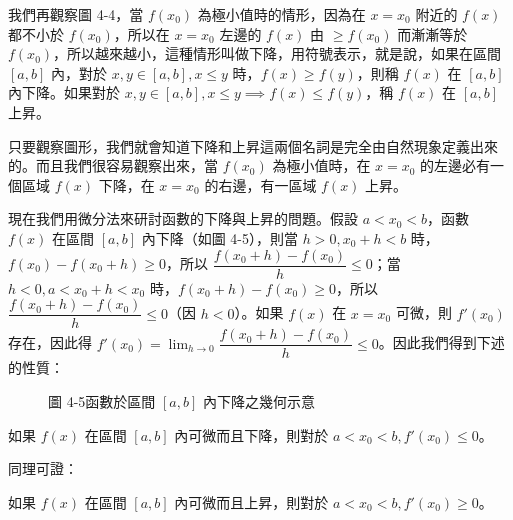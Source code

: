 我們再觀察圖 4-4，當 $f(x_0)$ 為極小值時的情形，因為在 $x=x_0$ 附近的 $f(x)$ 都不小於 $f(x_0)$，所以在 $x=x_0$ 左邊的 $f(x)$ 由 $\ge f(x_0)$ 而漸漸等於 $f(x_0)$，所以越來越小，這種情形叫做下降，用符號表示，就是說，如果在區間 $[a, b]$ 內，對於 $x, y\in[a, b], x\le y$ 時，$f(x)\ge f(y)$，則稱 $f(x)$ 在 $[a, b]$ 內下降。如果對於 $x, y\in[a, b], x\le y \implies f(x)\le f(y)$，稱 $f(x)$ 在 $[a, b]$ 上昇。

只要觀察圖形，我們就會知道下降和上昇這兩個名詞是完全由自然現象定義出來的。而且我們很容易觀察出來，當 $f(x_0)$ 為極小值時，在 $x=x_0$ 的左邊必有一個區域 $f(x)$ 下降，在 $x=x_0$ 的右邊，有一區域 $f(x)$ 上昇。

現在我們用微分法來研討函數的下降與上昇的問題。假設 $a<x_0<b$，函數 $f(x)$ 在區間 $[a, b]$ 內下降（如圖 4-5），則當 $h>0, x_0+h<b$ 時，$f(x_0)-f(x_0+h) \ge 0$，所以 $\dfrac{f(x_0+h)-f(x_0)}{h} \le 0$；當 $h<0, a<x_0+h<x_0$ 時，$f(x_0+h)-f(x_0) \ge 0$，所以 $\dfrac{f(x_0+h)-f(x_0)}{h} \le 0$（因 $h<0$）。如果 $f(x)$ 在 $x=x_0$ 可微，則 $f'(x_0)$ 存在，因此得 $f'(x_0) = \lim_{h\to 0}\dfrac{f(x_0+h)-f(x_0)}{h} \le 0$。因此我們得到下述的性質：

\begin{figure}[H]
\centering
{}
\caption{圖 4-5\quad 函數於區間 $[a, b]$ 內下降之幾何示意}
\label{fig:b6s-app4-decreasing}
\end{figure}

\begin{theorem}\label{thm:b6s-app4-monotonicity}
如果 $f(x)$ 在區間 $[a, b]$ 內可微而且下降，則對於 $a<x_0<b, f'(x_0) \le 0$。
\end{theorem}

同理可證：

\begin{theorem}\label{thm:b6s-app4-monotonicity-inc}
如果 $f(x)$ 在區間 $[a, b]$ 內可微而且上昇，則對於 $a<x_0<b, f'(x_0) \ge 0$。
\end{theorem}

